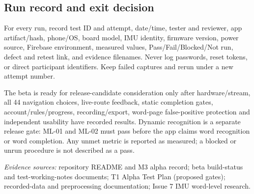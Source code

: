\documentclass[10pt,letterpaper]{article}
\begin{document}
\subsection{Run record and exit decision}
For every run, record test ID and attempt, date/time, tester and reviewer, app artifact/hash, phone/OS, board model, IMU identity, firmware version, power source, Firebase environment, measured values, Pass/Fail/Blocked/Not run, defect and retest link, and evidence filenames. Never log passwords, reset tokens, or direct participant identifiers. Keep failed captures and rerun under a new attempt number.

The beta is ready for release-candidate consideration only after hardware/stream, all 44 navigation choices, live-route feedback, static completion gates, account/rules/progress, recording/export, word-page false-positive protection and independent usability have recorded results. Dynamic recognition is a separate release gate: ML-01 and ML-02 must pass before the app claims word recognition or word completion. Any unmet metric is reported as measured; a blocked or unrun procedure is not described as a pass.

\small\textit{Evidence sources:} repository README and M3 alpha record; beta build-status and test-working-notes documents; T1 Alpha Test Plan (proposed gates); recorded-data and preprocessing documentation; Issue 7 IMU word-level research.
\end{document}
